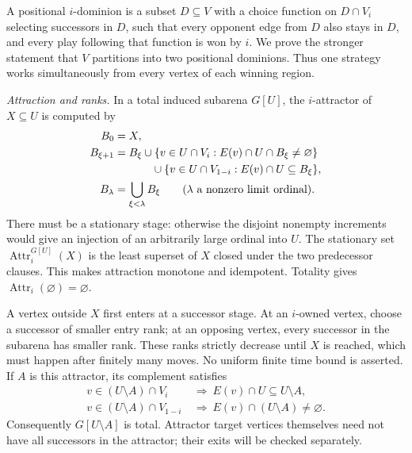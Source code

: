 A positional \(i\)-dominion is a subset \(D\subseteq V\)
with a choice function on \(D\cap V_i\)
selecting successors in \(D\), such that
every opponent edge from \(D\) also stays
in \(D\), and every play following that
function is won by \(i\).
We prove the stronger statement that \(V\)
partitions into two positional dominions.
Thus one strategy works simultaneously
from every vertex of each winning region.

\emph{Attraction and ranks.}
In a total induced subarena \(G[U]\), the
\(i\)-attractor of \(X\subseteq U\) is
computed by
\[
\begin{aligned}
 B_0&=X,\\
 B_{\xi+1}&=B_\xi
  \cup\{v\in U\cap V_i:E(v)\cap U\cap B_\xi\ne\varnothing\}\\
 &\hspace{12mm}\cup
    \{v\in U\cap V_{1-i}:E(v)\cap U\subseteq B_\xi\},\\
 B_\lambda&=\bigcup_{\xi<\lambda}B_\xi
                 \qquad(\lambda\text{ a nonzero limit ordinal}).
\end{aligned}
\]
There must be a stationary stage: otherwise
the disjoint nonempty increments would give
an injection of an arbitrarily large ordinal
into \(U\). The stationary set
\(\operatorname{Attr}_i^{G[U]}(X)\) is
the least superset of \(X\) closed under
the two predecessor clauses. This makes
attraction monotone and idempotent.
Totality gives \(\operatorname{Attr}_i(\varnothing)
=\varnothing\).

A vertex outside \(X\) first enters at a
successor stage. At an \(i\)-owned vertex,
choose a successor of smaller entry rank;
at an opposing vertex, every successor
in the subarena has smaller rank.
These ranks strictly decrease until \(X\)
is reached, which must happen after
finitely many moves. No uniform finite
time bound is asserted.
If \(A\) is this attractor, its complement
satisfies
\[
\begin{aligned}
 v\in(U\setminus A)\cap V_i
     &\ \Longrightarrow\ E(v)\cap U\subseteq U\setminus A,\\
 v\in(U\setminus A)\cap V_{1-i}
     &\ \Longrightarrow\ E(v)\cap(U\setminus A)\ne\varnothing.
\end{aligned}
\]
Consequently \(G[U\setminus A]\) is total.
Attractor target vertices themselves need
not have all successors in the attractor;
their exits will be checked separately.

